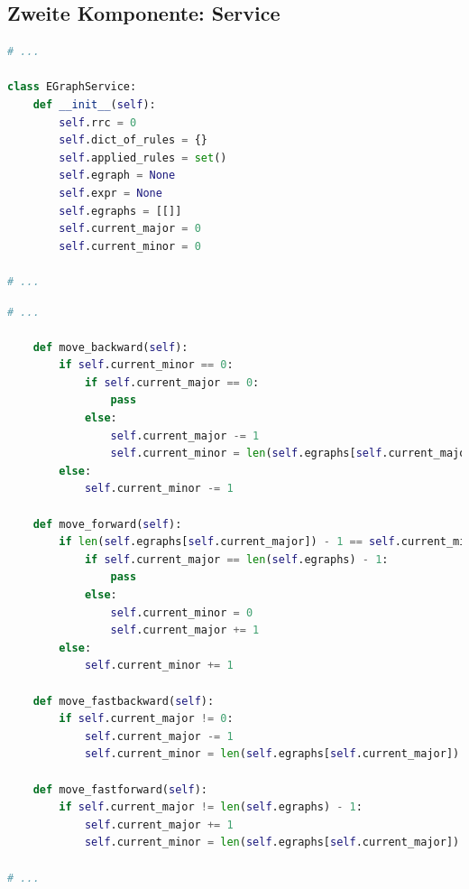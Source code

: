


\subsection{Zweite Komponente: Service}



\begin{lstlisting}[language=Python, caption=Auszug aus der Datei \textit{EGraphService.py}]
# ... 

class EGraphService:
    def __init__(self):
        self.rrc = 0
        self.dict_of_rules = {}
        self.applied_rules = set()
        self.egraph = None
        self.expr = None
        self.egraphs = [[]]
        self.current_major = 0
        self.current_minor = 0

# ... 
\end{lstlisting} 





\begin{lstlisting}[language=Python, caption=Methoden für das Debugging aus der Datei \textit{EGraphService.py}]
# ... 

    def move_backward(self):
        if self.current_minor == 0:
            if self.current_major == 0:
                pass
            else:
                self.current_major -= 1
                self.current_minor = len(self.egraphs[self.current_major]) - 1
        else:
            self.current_minor -= 1

    def move_forward(self):
        if len(self.egraphs[self.current_major]) - 1 == self.current_minor:
            if self.current_major == len(self.egraphs) - 1:
                pass
            else:
                self.current_minor = 0
                self.current_major += 1
        else:
            self.current_minor += 1

    def move_fastbackward(self):
        if self.current_major != 0:
            self.current_major -= 1
            self.current_minor = len(self.egraphs[self.current_major]) - 1

    def move_fastforward(self):
        if self.current_major != len(self.egraphs) - 1:
            self.current_major += 1
            self.current_minor = len(self.egraphs[self.current_major]) - 1

# ... 
\end{lstlisting} 



